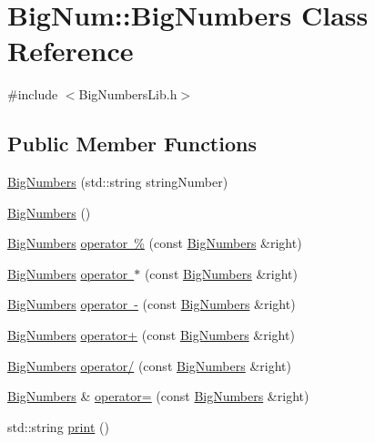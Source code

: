\hypertarget{class_big_num_1_1_big_numbers}{}\section{Big\+Num\+::Big\+Numbers Class Reference}
\label{class_big_num_1_1_big_numbers}


{\ttfamily \#include $<$Big\+Numbers\+Lib.\+h$>$}

\subsection*{Public Member Functions}
\begin{DoxyCompactItemize}
\item 
\mbox{\hyperlink{class_big_num_1_1_big_numbers_a93b64afc4bf7066a411fe5dae6b2d5bc}{Big\+Numbers}} (std\+::string string\+Number)
\item 
\mbox{\hyperlink{class_big_num_1_1_big_numbers_a0c13ca87447b955a385ab91c8e7f5485}{Big\+Numbers}} ()
\item 
\mbox{\hyperlink{class_big_num_1_1_big_numbers}{Big\+Numbers}} \mbox{\hyperlink{class_big_num_1_1_big_numbers_a0d291c88f1fb0a6cd95c3baf89d6df5c}{operator \%}} (const \mbox{\hyperlink{class_big_num_1_1_big_numbers}{Big\+Numbers}} \&right)
\item 
\mbox{\hyperlink{class_big_num_1_1_big_numbers}{Big\+Numbers}} \mbox{\hyperlink{class_big_num_1_1_big_numbers_a466d795237fe78d8b981a93b741a352b}{operator $\ast$}} (const \mbox{\hyperlink{class_big_num_1_1_big_numbers}{Big\+Numbers}} \&right)
\item 
\mbox{\hyperlink{class_big_num_1_1_big_numbers}{Big\+Numbers}} \mbox{\hyperlink{class_big_num_1_1_big_numbers_a06db1ba12eaf5ca752aa8a8b87efe531}{operator -\/}} (const \mbox{\hyperlink{class_big_num_1_1_big_numbers}{Big\+Numbers}} \&right)
\item 
\mbox{\hyperlink{class_big_num_1_1_big_numbers}{Big\+Numbers}} \mbox{\hyperlink{class_big_num_1_1_big_numbers_aeed7d0a3044d69217bf540f4b3961f1c}{operator+}} (const \mbox{\hyperlink{class_big_num_1_1_big_numbers}{Big\+Numbers}} \&right)
\item 
\mbox{\hyperlink{class_big_num_1_1_big_numbers}{Big\+Numbers}} \mbox{\hyperlink{class_big_num_1_1_big_numbers_acaae8dc39899d3efac164375db5198fc}{operator/}} (const \mbox{\hyperlink{class_big_num_1_1_big_numbers}{Big\+Numbers}} \&right)
\item 
\mbox{\hyperlink{class_big_num_1_1_big_numbers}{Big\+Numbers}} \& \mbox{\hyperlink{class_big_num_1_1_big_numbers_a58d5b06cac7d5ca322d4550821f8edcf}{operator=}} (const \mbox{\hyperlink{class_big_num_1_1_big_numbers}{Big\+Numbers}} \&right)
\item 
std\+::string \mbox{\hyperlink{class_big_num_1_1_big_numbers_aecf5b4256cb25c3b1e3c5a12138844f6}{print}} ()
\end{DoxyCompactItemize}
